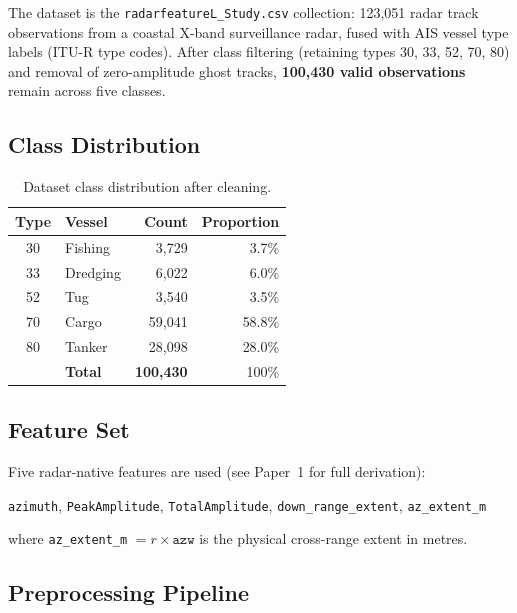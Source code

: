 \documentclass[journal]{IEEEtran}
\begin{document}
The dataset is the \texttt{radarfeatureL\_Study.csv} collection:
123,051 radar track observations from a coastal X-band surveillance radar,
fused with AIS vessel type labels (ITU-R type codes). After class filtering
(retaining types 30, 33, 52, 70, 80) and removal of zero-amplitude ghost
tracks, \textbf{100,430 valid observations} remain across five classes.

\subsection{Class Distribution}

\begin{table}[H]
\centering
\caption{Dataset class distribution after cleaning.}
\begin{tabular}{clrr}
\toprule
\textbf{Type} & \textbf{Vessel} & \textbf{Count} & \textbf{Proportion} \\
\midrule
30 & Fishing     & 3,729  & 3.7\% \\
33 & Dredging    & 6,022  & 6.0\% \\
52 & Tug         & 3,540  & 3.5\% \\
70 & Cargo       & 59,041 & 58.8\% \\
80 & Tanker      & 28,098 & 28.0\% \\
\midrule
   & \textbf{Total} & \textbf{100,430} & 100\% \\
\bottomrule
\end{tabular}
\end{table}

\subsection{Feature Set}

Five radar-native features are used (see Paper~1 for full derivation):

\begin{center}
\texttt{azimuth}, \texttt{PeakAmplitude}, \texttt{TotalAmplitude},
\texttt{down\_range\_extent}, \texttt{az\_extent\_m}
\end{center}

where \texttt{az\_extent\_m} $= r \times \texttt{azw}$ is the physical
cross-range extent in metres.

\subsection{Preprocessing Pipeline}
\end{document}
